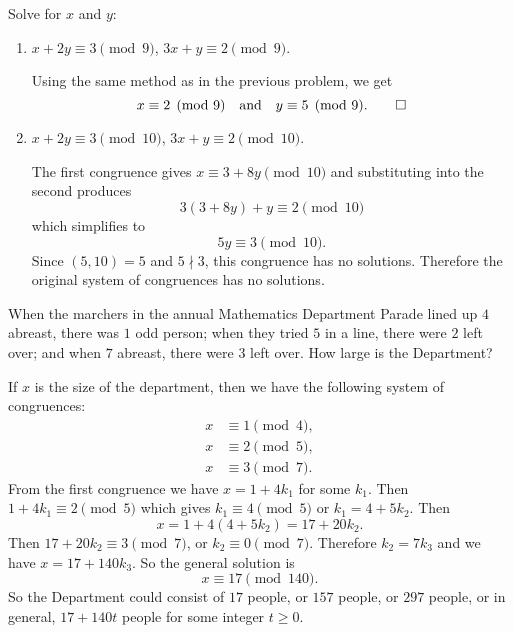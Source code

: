  Solve for $x$ and $y$:
\begin{enumerate}
\item $x+2y\equiv3\pmod9$, $3x+y\equiv2\pmod9$.
  \begin{solution}
    Using the same method as in the previous problem, we get
    \begin{equation*}
      x\equiv2\pmod9 \quad\text{and}\quad y\equiv5\pmod9. \qedhere
    \end{equation*}
  \end{solution}
\item $x+2y\equiv3\pmod{10}$, $3x+y\equiv2\pmod{10}$.
  \begin{solution}
    The first congruence gives $x\equiv3 + 8y\pmod{10}$ and
    substituting into the second produces
    \begin{equation*}
      3(3 + 8y) + y \equiv 2\pmod{10}
    \end{equation*}
    which simplifies to
    \begin{equation*}
      5y \equiv 3 \pmod{10}.
    \end{equation*}
    Since $(5,10) = 5$ and $5\nmid3$, this congruence has no
    solutions. Therefore the original system of congruences has no
    solutions.
  \end{solution}
\end{enumerate}

 When the marchers in the annual Mathematics Department
Parade lined up $4$ abreast, there was $1$ odd person; when they tried
$5$ in a line, there were $2$ left over; and when $7$ abreast, there
were $3$ left over. How large is the Department?
\begin{solution}
  If $x$ is the size of the department, then we have the following
  system of congruences:
  \begin{align*}
    x&\equiv1\pmod4, \\
    x&\equiv2\pmod5, \\
    x&\equiv3\pmod7.
  \end{align*}
  From the first congruence we have $x = 1 + 4k_1$ for some
  $k_1$. Then $1 + 4k_1\equiv2\pmod5$ which gives $k_1\equiv4\pmod5$
  or $k_1 = 4 + 5k_2$. Then
  \begin{equation*}
    x = 1 + 4(4 + 5k_2) = 17 + 20k_2.
  \end{equation*}
  Then $17 + 20k_2\equiv3\pmod7$, or $k_2\equiv0\pmod7$. Therefore
  $k_2 = 7k_3$ and we have $x = 17 + 140k_3$. So the general solution is
  \begin{equation*}
    x \equiv 17\pmod{140}.
  \end{equation*}
  So the Department could consist of $17$ people, or $157$ people, or
  $297$ people, or in general, $17 + 140t$ people for some integer
  $t\geq0$.
\end{solution}

